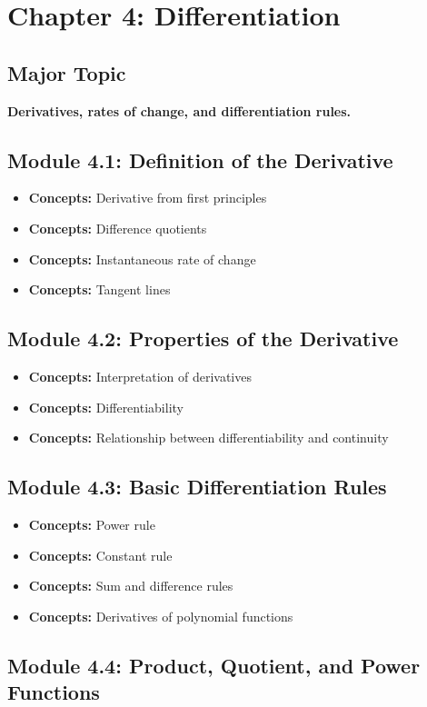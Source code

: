 \documentclass[11pt]{article}
\newcommand{\concept}[1]{\item \textbf{Concepts:} #1}
\begin{document}

\section{Chapter 4: Differentiation}

\subsection{Major Topic}

\textbf{Derivatives, rates of change, and differentiation rules.}

\subsection{Module 4.1: Definition of the Derivative}

\begin{itemize}
    \concept{Derivative from first principles}
    \concept{Difference quotients}
    \concept{Instantaneous rate of change}
    \concept{Tangent lines}
\end{itemize}

\subsection{Module 4.2: Properties of the Derivative}

\begin{itemize}
    \concept{Interpretation of derivatives}
    \concept{Differentiability}
    \concept{Relationship between differentiability and continuity}
\end{itemize}

\subsection{Module 4.3: Basic Differentiation Rules}

\begin{itemize}
    \concept{Power rule}
    \concept{Constant rule}
    \concept{Sum and difference rules}
    \concept{Derivatives of polynomial functions}
\end{itemize}

\subsection{Module 4.4: Product, Quotient, and Power Functions}
\end{document}
